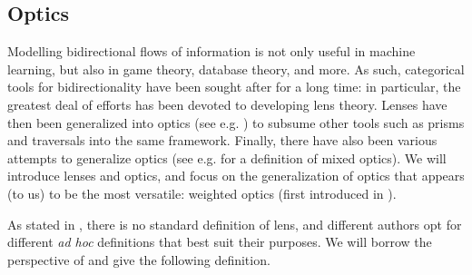 \documentclass[11pt,a4paper,openright,twoside]{report}
\theoremstyle{plain}
\theoremstyle{definition}
\begin{document}
\subsection{Optics}

Modelling bidirectional flows of information is not only useful in machine learning, but also in game theory, database theory, and more. As such, categorical tools for bidirectionality have been sought after for a long time: in particular, the greatest deal of efforts has been devoted to developing lens theory. Lenses have then been generalized into optics (see e.g. \cite{riley2018categories}) to subsume other tools such as prisms and traversals into the same framework. Finally, there have also been various attempts to generalize optics (see e.g. \cite{clarke2024profunctor} for a definition of mixed optics). We will introduce lenses and optics, and focus on the generalization of optics that appears (to us) to be the most versatile: weighted optics (first introduced in \cite{gavranovic2024fundamental}). 


As stated in \cite{gavranovic2024fundamental}, there is no standard definition of lens, and different authors opt for different \textit{ad hoc} definitions that best suit their purposes. We will borrow the perspective of \cite{cruttwell2022categorical} and give the following definition.
\end{document}

